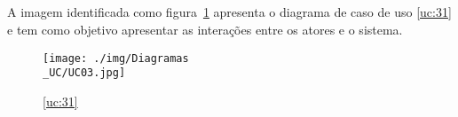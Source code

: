 \subsection{}
A imagem identificada como figura~\ref{fig:chap213} apresenta o diagrama de caso de uso \ref{uc:31} e tem como objetivo apresentar as interações entre os atores e o sistema.

\vspace*{5mm}

\begin{figure}[H]
	\centering
	\texttt{[image: ./img/Diagramas\\\_UC/UC03.jpg]}  %
	\caption{\ref{uc:31}}
	\label{fig:chap213}
\end{figure}

\newpage

